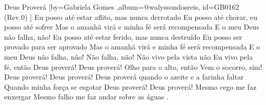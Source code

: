 \beginsong
{Deus Proverá %
}[by={Gabriela Gomes  %
},album={@walyssondosreis},
id={GB0162 %
(Rev.0) %
}]
\beginverse
Eu posso até estar aflito, mas nunca derrotado
Eu posso até chorar, eu posso até sofrer
Mas o amanhã virá e minha fé será recompensada
E o meu Deus não falha, não!
\endverse
\beginverse
Eu posso até estar ferido, mas nunca destruído
Eu posso ser provado para ser aprovado
Mas o amanhã virá e minha fé será recompensada
E o meu Deus não falha, não!
Não falha, não!
\endverse
\beginverse
Não vivo pela vista não
Eu vivo pela fé, então
Deus proverá! Deus proverá!
Olho para o alto, então
Vem o socorro, sim!
Deus proverá! Deus proverá!
\endverse
\beginchorus
Deus proverá quando o azeite e a farinha faltar
Quando minha força se esgotar
Deus proverá! Deus proverá!
Mesmo cego me faz enxergar
Mesmo falho me faz andar sobre as águas
\endchorus
\beginverse*
.
\endverse
\begin{comment}
\lstset{basicstyle=\scriptsize\bf} %
\tab{Solo 1}
\begin{lstlisting}
E|-----------------------------------------------------|
B|-----------------------------------------------------|
G|-----------------------------------------------------|
D|-----------------------------------------------------|
A|-----------------------------------------------------|
E|-----------------------------------------------------|
\end{lstlisting}
\end{comment}
\vspace{2em} 
% 
% 
% 
